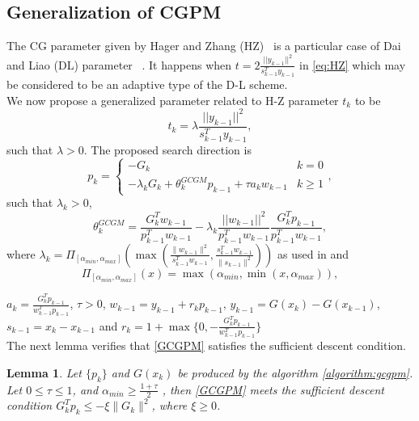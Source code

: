 \documentclass{article}
\newtheorem{lemma}{Lemma}
\theoremstyle{remark}
\begin{document}
\subsection{Generalization of CGPM}
The CG parameter given by Hager and Zhang (HZ)~\cite{hager2005new} is a particular case of  Dai and Liao (DL) parameter ~\cite{dai2012another}. It happens when $t=2\frac{||y_{k-1}||^2}{s_{k-1}^Ty_{k-1}}$ in \eqref{eq:HZ} which may be considered to be an adaptive type of the D-L scheme.\\
We now propose a generalized parameter related to H-Z parameter $t_k$ to be 
\begin{equation}\label{eq:newhz}
t_k=\lambda \frac{||y_{k-1}||^2}{s_{k-1}^Ty_{k-1}},
\end{equation}
such that $\lambda > 0$. The proposed search direction is 
\begin{equation}
p_k=\begin{cases}\label{GCGPM}
    -G_k & k=0\\
    -\lambda_k G_k+\theta_k^{GCGM}p_{k-1}+ \tau a_kw_{k-1}& k\geq 1
\end{cases},
\end{equation}
such that $\lambda_k > 0$,
\begin{equation}
\label{eq:optimalcgpmpara}
    \theta_k^{GCGM}=\frac{G_k^Tw_{k-1}}{p_{k-1}^Tw_{k-1}}-\lambda_k\frac{||w_{k-1}||^2}{p_{k-1}^Tw_{k-1}}\frac{G_k^Tp_{k-1}}{p_{k-1}^Tw_{k-1}}, 
\end{equation}
where $\lambda_k=\Pi_{[\alpha_{min}, \alpha_{max}]}(\max(\frac{\|w_{k-1}\|^2}{s_{k-1}^Tw_{k-1}}, \frac{s_{k-1}^Tw_{k-1}}{\|s_{k-1}\|^2}))$ as used in \cite{sabi2020two} and 
\[
\Pi_{[\alpha_{min}, \alpha_{max}]}(x)=\max(\alpha_{min}, \min(x, \alpha_{max})),
\]

$a_k=\frac{G_k^Tp_{k-1}}{w_{k-1}^Tp_{k-1}}$, $\tau >0$, $w_{k-1}=y_{k-1}+r_kp_{k-1}$, $y_{k-1}=G(x_k)-G(x_{k-1})$, $s_{k-1}=x_k-x_{k-1}$ and  $r_k=1+\max\{0,-\frac{G_k^Tp_{k-1}}{w_{k-1}^Tp_{k-1}} \}$ \\
The next lemma verifies that \eqref{GCGPM} satisfies the sufficient descent condition. 


\begin{lemma}
\label{lemm1:gcgpm}
Let $\{p_k\}$ and $G(x_k)$ be produced by the algorithm \ref{algorithm:gcgpm}. Let  $0\leq \tau\leq 1$, and $\alpha_{min} \geq \frac{1+\tau}{2}$  , then  \eqref{GCGPM} meets the sufficient descent  condition $G_k^Tp_k\leq -\xi\|G_k\|^2$, where $\xi\geq 0$.

\end{lemma}
\end{document}
